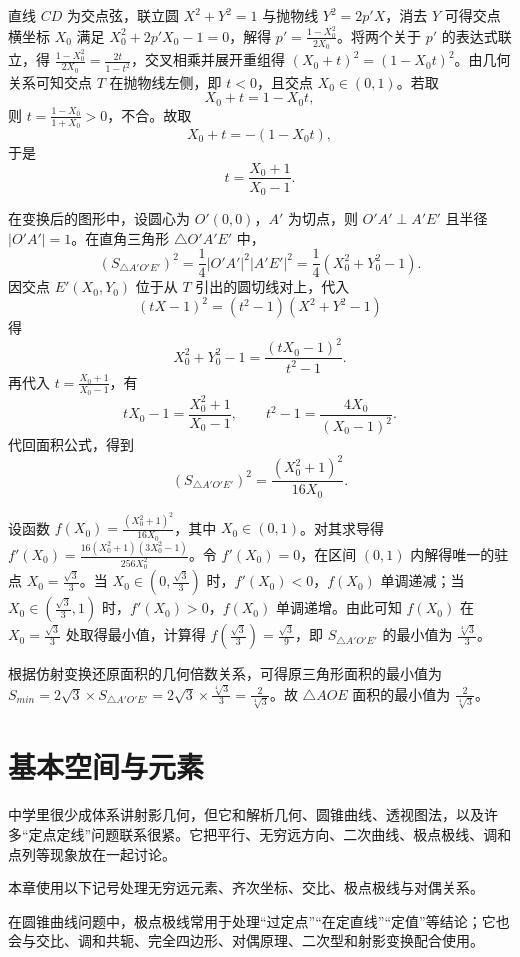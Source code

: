 \begin{solution}
直线 $CD$ 为交点弦，联立圆 $X^2+Y^2=1$ 与抛物线 $Y^2=2p'X$，消去 $Y$ 可得交点横坐标 $X_0$ 满足 $X_0^2 + 2p'X_0 - 1 = 0$，解得 $p' = \frac{1-X_0^2}{2X_0}$。将两个关于 $p'$ 的表达式联立，得 $\frac{1-X_0^2}{2X_0} = \frac{2t}{1-t^2}$，交叉相乘并展开重组得 $(X_0+t)^2 = (1-X_0t)^2$。由几何关系可知交点 $T$ 在抛物线左侧，即 $t<0$，且交点 $X_0 \in (0,1)$。若取
\[
X_0+t=1-X_0t,
\]
则 $t=\frac{1-X_0}{1+X_0}>0$，不合。故取
\[
X_0+t=-(1-X_0t),
\]
于是
\[
t=\frac{X_0+1}{X_0-1}.
\]

在变换后的图形中，设圆心为 $O'(0,0)$，$A'$ 为切点，则 $O'A' \perp A'E'$ 且半径 $|O'A'|=1$。在直角三角形 $\triangle O'A'E'$ 中，
\[
(S_{\triangle A'O'E'})^2
=\frac14 |O'A'|^2|A'E'|^2
=\frac14(X_0^2+Y_0^2-1).
\]
因交点 $E'(X_0,Y_0)$ 位于从 $T$ 引出的圆切线对上，代入
\[
(tX-1)^2=(t^2-1)(X^2+Y^2-1)
\]
得
\[
X_0^2+Y_0^2-1=\frac{(tX_0-1)^2}{t^2-1}.
\]
再代入 $t=\frac{X_0+1}{X_0-1}$，有
\[
tX_0-1=\frac{X_0^2+1}{X_0-1},\qquad
t^2-1=\frac{4X_0}{(X_0-1)^2}.
\]
代回面积公式，得到
\[
(S_{\triangle A'O'E'})^2=\frac{(X_0^2+1)^2}{16X_0}.
\]

设函数 $f(X_0) = \frac{(X_0^2+1)^2}{16X_0}$，其中 $X_0 \in (0, 1)$。对其求导得 $f'(X_0) = \frac{16(X_0^2+1)(3X_0^2-1)}{256X_0^2}$。令 $f'(X_0) = 0$，在区间 $(0,1)$ 内解得唯一的驻点 $X_0 = \frac{\sqrt{3}}{3}$。当 $X_0 \in (0, \frac{\sqrt{3}}{3})$ 时，$f'(X_0) < 0$，$f(X_0)$ 单调递减；当 $X_0 \in (\frac{\sqrt{3}}{3}, 1)$ 时，$f'(X_0) > 0$，$f(X_0)$ 单调递增。由此可知 $f(X_0)$ 在 $X_0 = \frac{\sqrt{3}}{3}$ 处取得最小值，计算得 $f\left(\frac{\sqrt{3}}{3}\right) = \frac{\sqrt{3}}{9}$，即 $S_{\triangle A'O'E'}$ 的最小值为 $\frac{\sqrt[4]{3}}{3}$。

根据仿射变换还原面积的几何倍数关系，可得原三角形面积的最小值为 $S_{min} = 2\sqrt{3} \times S_{\triangle A'O'E'} = 2\sqrt{3} \times \frac{\sqrt[4]{3}}{3} = \frac{2}{\sqrt[4]{3}}$。故 $\triangle AOE$ 面积的最小值为 $\frac{2}{\sqrt[4]{3}}$。
\end{solution}


\chapter{基本空间与元素}

中学里很少成体系讲射影几何，但它和解析几何、圆锥曲线、透视图法，以及许多“定点定线”问题联系很紧。它把平行、无穷远方向、二次曲线、极点极线、调和点列等现象放在一起讨论。

本章使用以下记号处理无穷远元素、齐次坐标、交比、极点极线与对偶关系。

在圆锥曲线问题中，极点极线常用于处理“过定点”“在定直线”“定值”等结论；它也会与交比、调和共轭、完全四边形、对偶原理、二次型和射影变换配合使用。

